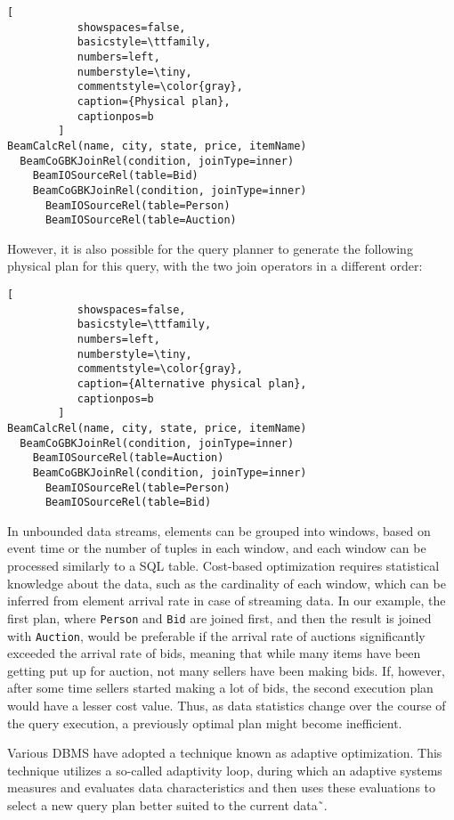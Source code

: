 \begin{lstlisting}[
           showspaces=false,
           basicstyle=\ttfamily,
           numbers=left,
           numberstyle=\tiny,
           commentstyle=\color{gray},
           caption={Physical plan}, 
           captionpos=b
        ]
BeamCalcRel(name, city, state, price, itemName)
  BeamCoGBKJoinRel(condition, joinType=inner)
    BeamIOSourceRel(table=Bid)
    BeamCoGBKJoinRel(condition, joinType=inner)
      BeamIOSourceRel(table=Person)
      BeamIOSourceRel(table=Auction)
\end{lstlisting}

However, it is also possible for the query planner to generate the following physical plan for this query, with the two join operators in a different order:

\begin{lstlisting}[
           showspaces=false,
           basicstyle=\ttfamily,
           numbers=left,
           numberstyle=\tiny,
           commentstyle=\color{gray},
           caption={Alternative physical plan}, 
           captionpos=b
        ]
BeamCalcRel(name, city, state, price, itemName)
  BeamCoGBKJoinRel(condition, joinType=inner)
    BeamIOSourceRel(table=Auction)
    BeamCoGBKJoinRel(condition, joinType=inner)
      BeamIOSourceRel(table=Person)
      BeamIOSourceRel(table=Bid)        
\end{lstlisting}


In unbounded data streams, elements can be grouped into windows, based on event time or the number of tuples in each window, and each window can be processed similarly to a SQL table. Cost-based optimization requires statistical knowledge about the data, such as the cardinality of each window, which can be inferred from element arrival rate in case of streaming data. In our example, the first plan, where \texttt{Person} and \texttt{Bid} are joined first, and then the result is joined with \texttt{Auction}, would be preferable if the arrival rate of auctions significantly exceeded the arrival rate of bids, meaning that while many items have been getting put up for auction, not many sellers have been making bids. If, however, after some time sellers started making a lot of bids, the second execution plan would have a lesser cost value. Thus, as data statistics change over the course of the query execution, a previously optimal plan might become inefficient. 

Various DBMS have adopted a technique known as adaptive optimization. This technique utilizes a so-called adaptivity loop, during which an adaptive systems measures and evaluates data characteristics and then uses these evaluations to select a new query plan better suited to the current data˜\cite{deshpande2007adaptive}. 

